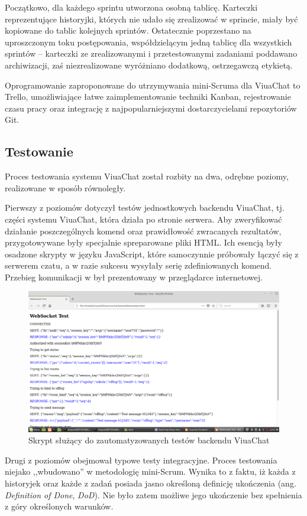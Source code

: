 Początkowo, dla każdego sprintu  utworzona osobną tablicę. Karteczki reprezentujące historyjki, których nie udało się
zrealizować w sprincie, miały być kopiowane do tablic kolejnych sprintów. Ostatecznie poprzestano na uproszczonym toku postępowania, współdzielącym
jedną tablicę dla wszystkich sprintów -- karteczki
ze zrealizowanymi i przetestowanymi zadaniami poddawano archiwizacji, zaś
niezrealizowane wyróżniano dodatkową, ostrzegawczą etykietą.

Oprogramowanie zaproponowane do utrzymywania mini-Scruma dla ViuaChat to Trello, umożliwiające łatwe
zaimplementowanie techniki Kanban, rejestrowanie czasu pracy oraz integrację z najpopularniejszymi
dostarczycielami repozytoriów Git.

\subsection{Testowanie}

Proces testowania systemu ViuaChat został rozbity na dwa, odrębne poziomy,
realizowane w sposób równoległy.

Pierwszy z poziomów dotyczył testów jednostkowych backendu ViuaChat, tj. części systemu ViuaChat, która działa po stronie serwera. Aby zweryfikować działanie poszczególnych
komend oraz prawidłowość zwracanych rezultatów, przygotowywane były specjalnie
spreparowane pliki HTML. Ich esencją były osadzone skrypty w języku JavaScript,
które samoczynnie próbowały łączyć się z serwerem czatu, a w razie sukcesu
wysyłały serię zdefiniowanych komend. Przebieg komunikacji w był prezentowany
w przeglądarce internetowej.

\begin{figure}[!htp]
	\centering
	\includegraphics[width=\textwidth]{strategia/fig/testyws}
	\caption{Skrypt służący do zautomatyzowanych testów backendu ViuaChat}
	\label{testy-ws}
\end{figure}

Drugi z poziomów obejmował typowe testy integracyjne. Proces testowania
niejako ,,wbudowano'' w metodologię mini-Scrum. Wynika to z faktu, iż każda
z historyjek oraz każde z zadań posiada jasno określoną definicję ukończenia
(ang. \textit{Definition of Done}, \textit{DoD}). Nie było zatem możliwe jego
ukończenie bez spełnienia z góry określonych warunków.
